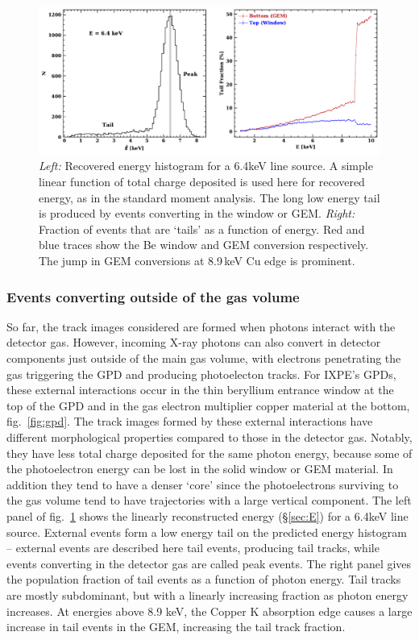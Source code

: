 \begin{figure}[t]
\centering
\includegraphics[width=1\textwidth]{figures/fig3.pdf}
\caption{\textit{Left:} Recovered energy histogram for a 6.4keV line source. A simple linear function of total charge deposited is used here for recovered energy, as in the standard moment analysis. The long low energy tail is produced by events converting in the window or GEM. \textit{Right:} Fraction of events that are `tails' as a function of energy. Red and blue traces show the Be window and GEM conversion respectively. The jump in GEM conversions at 8.9\,keV Cu edge is prominent.}
\label{fig:tails}       %
\end{figure}

\subsubsection{Events converting outside of the gas volume}
\label{sec:tail}
So far, the track images considered are formed when photons interact with the detector gas. However, incoming X-ray photons can also convert in detector components just outside of the main gas volume, with electrons penetrating the gas triggering the GPD and producing photoelecton tracks. For IXPE's GPDs, these external interactions occur in the thin beryllium entrance window at the top of the GPD and in the gas electron multiplier copper material at the bottom, fig.~\ref{fig:gpd}. The track images formed by these external interactions have different morphological properties compared to those in the detector gas. Notably, they have less total charge deposited for the same photon energy, because some of the photoelectron energy can be lost in the solid window or GEM material. In addition they tend to have a denser `core' since the photoelectrons surviving to the gas volume tend to have trajectories with a large vertical component. The left panel of fig.~\ref{fig:tails} shows the linearly reconstructed energy (\S\ref{sec:E}) for a 6.4keV line source. External events form a low energy tail on the predicted energy histogram -- external events are described here tail events, producing tail tracks, while events converting in the detector gas are called peak events. The right panel gives the population fraction of tail events as a function of photon energy. Tail tracks are mostly subdominant, but with a linearly increasing fraction as photon energy increases. At energies above 8.9 keV, the Copper K absorption edge causes a large increase in tail events in the GEM, increasing the tail track fraction.

